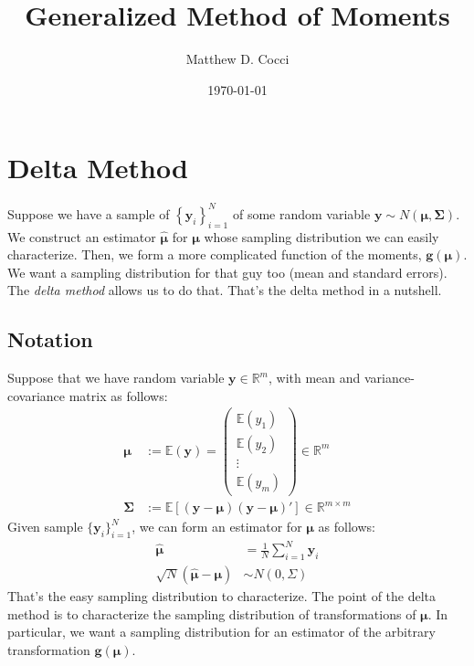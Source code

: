 \documentclass[12pt]{article}
\author{Matthew D. Cocci}
\title{Generalized Method of Moments}
\date{\today}
\theoremstyle{plain}
\theoremstyle{definition}
\theoremstyle{remark}
\begin{document}

\maketitle

\tableofcontents %

\clearpage
\section{Delta Method}

Suppose we have a sample of $\left\{\boldsymbol{y}_i\right\}_{i=1}^N$ of
some random variable $\boldsymbol{y}\sim
N(\boldsymbol{\mu},\boldsymbol{\Sigma})$. We construct an estimator
$\boldsymbol{\hat{\mu}}$ for $\boldsymbol{\mu}$ whose sampling
distribution we can easily characterize. Then, we form a more
complicated function of the moments, $\boldsymbol{g}(\boldsymbol{\mu})$.
We want a sampling distribution for that guy too (mean and standard
errors). The \emph{delta method} allows us to do that. That's the delta
method in a nutshell.

\subsection{Notation}

Suppose that we have random variable $\boldsymbol{y}\in \mathbb{R}^m$,
with mean and variance-covariance matrix as follows:
\begin{align*}
  \boldsymbol{\mu} &:= \mathbb{E}(\boldsymbol{y}) =
  \begin{pmatrix}
    \mathbb{E}(y_1)\\\mathbb{E}(y_2)\\\vdots\\\mathbb{E}(y_m)
  \end{pmatrix}
  \in \mathbb{R}^m
  \\
  \boldsymbol{\Sigma}
  &:=
  \mathbb{E}\left[
    (\boldsymbol{y}-\boldsymbol{\mu})
    (\boldsymbol{y}-\boldsymbol{\mu})'
  \right]
  \in \mathbb{R}^{m\times m}
\end{align*}
Given sample $\{\boldsymbol{y}_i\}_{i=1}^N$, we can form an estimator
for $\boldsymbol{\mu}$ as follows:
\begin{align*}
  \boldsymbol{\hat{\mu}}
  &=
  \frac{1}{N}
  \sum^N_{i=1}
  \boldsymbol{y}_i\\
  \sqrt{N}(\boldsymbol{\hat{\mu}} - \boldsymbol{\mu})
  &\sim N(0,\Sigma)
\end{align*}
That's the easy sampling distribution to characterize. The point of the
delta method is to characterize the sampling distribution of
transformations of $\boldsymbol{\mu}$. In particular, we want a sampling
distribution for an estimator of the arbitrary transformation
$\boldsymbol{g}(\boldsymbol{\mu})$.
\end{document}
